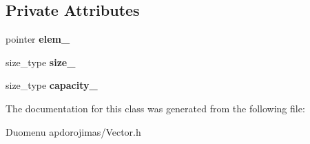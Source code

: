 \subsection*{Private Attributes}
\begin{DoxyCompactItemize}
\item 
\mbox{\label{classvector_a0bdd1f4e4e256c8b3fd64fce6beb2796}} 
pointer {\bfseries elem\+\_\+}
\item 
\mbox{\label{classvector_a383759345091c08f09a78f7da029a922}} 
size\+\_\+type {\bfseries size\+\_\+}
\item 
\mbox{\label{classvector_a9ab870316db1ae9cd13eed6e3e7faa93}} 
size\+\_\+type {\bfseries capacity\+\_\+}
\end{DoxyCompactItemize}


The documentation for this class was generated from the following file\+:\begin{DoxyCompactItemize}
\item 
Duomenu apdorojimas/Vector.\+h\end{DoxyCompactItemize}
